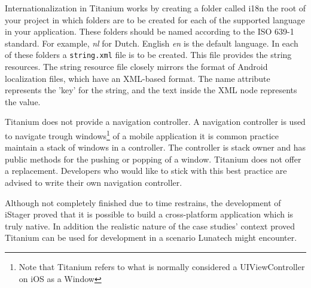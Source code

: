 
Internationalization in Titanium works by creating a folder called i18n the root of your project in which folders are to be created for each of the supported language in your application. These folders should be named according to the  ISO 639-1 standard. For example, \emph{nl} for Dutch. English \emph{en} is the default language. In each of these folders a \texttt{string.xml} file is to be created. This file provides the string resources. The string resource file closely mirrors the format of Android localization files, which have an XML-based format. The name attribute represents the 'key' for the string, and the text inside the XML node represents the value. %

Titanium does not provide a navigation controller. A navigation controller is used to navigate trough windows\footnote{Note that Titanium refers to what is normally considered a UIViewController on iOS as a Window} of a mobile application it is common practice maintain a stack of windows in a controller. The controller is stack owner and has public methods for the pushing or popping of a window. 
Titanium does not offer a replacement. Developers who would like to stick with this best practice are advised to write their own navigation controller. %


Although not completely finished due to time restrains, the development of iStager proved that it is possible to build a cross-platform application which is truly native. In addition the realistic nature of the case studies' context proved Titanium can be used for development in a scenario Lunatech might encounter. 